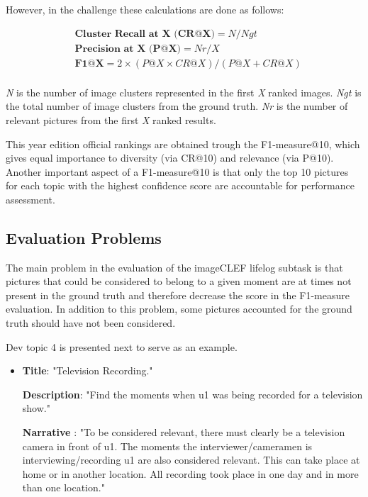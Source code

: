         However, in the challenge these calculations are done as follows:

        \begin{align*}
            &\textbf{Cluster Recall at X (CR@X)}  =  N / Ngt \\ 
            &\textbf{Precision at X (P@X)} = Nr / X \\ 
            &\textbf{F1@X}  =  2\times(P@X \times CR@X)/(P@X + CR@X) \\ 
        \end{align*}

        \textit{N} is the number of image clusters represented in the first \textit{X} ranked images. \textit{Ngt} is the total number of image clusters from the ground truth. \textit{Nr} is the number of relevant pictures from the first \textit{X} ranked results.

        This year edition official rankings are obtained trough the F1-measure@10, which gives equal importance to diversity (via CR@10) and relevance (via P@10). Another important aspect of a F1-measure@10 is that only the top 10 pictures for each topic with the highest confidence score are accountable for performance assessment.



     
  
        
    \subsection{Evaluation Problems}
    \label{sec:ev_problems}

    The main problem in the evaluation of the imageCLEF lifelog subtask is that  pictures that could be considered to belong to a given moment are at times not present in the ground truth and therefore decrease the score in the F1-measure evaluation. In addition to this problem, some pictures accounted for the ground truth should have not been considered.

    Dev topic 4 is presented next to serve as an example.

    \begin{itemize}

        \item[] \textbf{Title}: "Television Recording."

        \textbf{Description}: "Find the moments when u1 was being recorded for
        a television show."

        \textbf{Narrative} : "To be considered relevant, there must clearly be a television camera in front of u1. The moments the interviewer/cameramen is interviewing/recording u1 are also considered relevant. This can take place at home or in another location. All recording took place in one day and in more than one location."

    \end{itemize}


